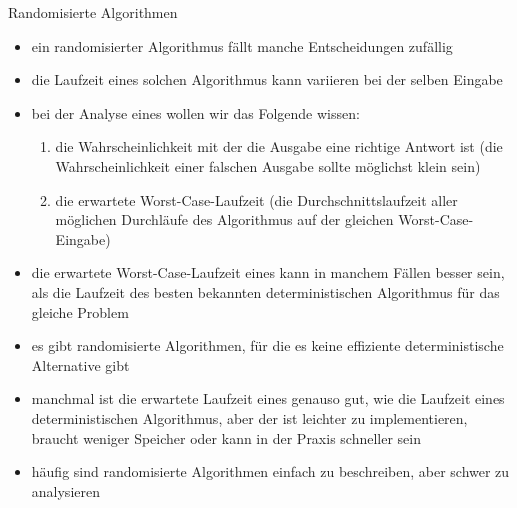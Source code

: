 \begin{TOP}{Randomisierte Algorithmen}
\vspace*{-2\baselineskip}\begin{itemize}[itemsep=-1pt]
	\item ein randomisierter Algorithmus fällt manche Entscheidungen zufällig
	\item die Laufzeit eines solchen Algorithmus kann variieren bei der selben Eingabe
	\item bei der Analyse eines  wollen wir das Folgende wissen:
		\begin{enumerate}
			\item die Wahrscheinlichkeit mit der die Ausgabe eine richtige Antwort ist (die Wahrscheinlichkeit einer falschen Ausgabe sollte möglichst klein sein)
			\item die erwartete Worst-Case-Laufzeit (die Durchschnittslaufzeit aller möglichen Durchläufe des Algorithmus auf der gleichen Worst-Case-Eingabe)
		\end{enumerate}
	\item die erwartete Worst-Case-Laufzeit eines  kann in manchem Fällen besser sein, als die Laufzeit des besten bekannten deterministischen Algorithmus für das gleiche Problem
	\item es gibt randomisierte Algorithmen, für die es keine effiziente deterministische Alternative gibt
	\item manchmal ist die erwartete Laufzeit eines  genauso gut, wie die Laufzeit eines deterministischen Algorithmus, aber der  ist leichter zu implementieren, braucht weniger Speicher oder kann in der Praxis schneller sein
	\item häufig sind randomisierte Algorithmen einfach zu beschreiben, aber schwer zu analysieren
\end{itemize}
\end{TOP}